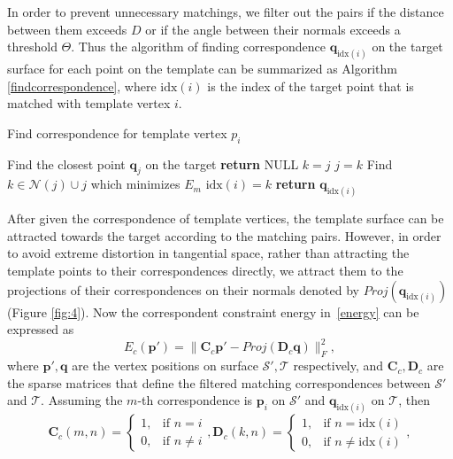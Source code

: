 In order to prevent unnecessary matchings, we filter out the pairs if the distance between them exceeds $D$ or if the angle between their normals exceeds a threshold $\Theta$. Thus the algorithm of finding correspondence $\mathbf q_{\text{idx}(i)}$ on the target surface for each point on the template can be summarized as Algorithm \eqref{findcorrespondence}, where $\text{idx}(i)$ is the index of the target point that is matched with template vertex $i$.
\begin{algorithm}[]
\caption{Find correspondence for template vertex $p_i$}
\label{findcorrespondence}
\begin{algorithmic}[1]
    \State Find the closest point $\mathbf q_j$ on the target
        \State  \textbf{return} NULL
    \EndIf
    \State $k = j$
    \Do
        \State $j = k$
        \State Find $k \in \mathcal{N}(j)\cup j$ which minimizes $E_m$
    \State $\text{idx}(i) = k$
    \State  \textbf{return} $\mathbf q_{\text{idx}(i)}$
\end{algorithmic}
\end{algorithm}
After given the correspondence of template vertices, the template surface can be attracted towards the target according to the matching pairs. However, in order to avoid extreme distortion in tangential space, rather than attracting the template points to their correspondences directly, we attract them to the projections of their correspondences on their normals denoted by $Proj(\mathbf q_{\text{idx}(i)})$ (Figure \ref{fig:4}). Now the correspondent constraint energy in~\eqref{energy} can be expressed as
\begin{equation}
E_c(\mathbf p') = \|\mathbf C_c\mathbf p'-Proj(\mathbf D_c\mathbf q)\|_F^2,
\end{equation}
where $\mathbf p', \mathbf q$ are the vertex positions on surface $\mathcal S',\mathcal T$ respectively, and $\mathbf C_c, \mathbf D_c$ are the sparse matrices that define the filtered matching correspondences between $\mathcal  S'$ and $\mathcal T$. Assuming the $m$-th correspondence is $\mathbf p_i$ on $\mathcal S'$ and $\mathbf q_{\text{idx}(i)}$ on $\mathcal T$, then
\[
    \mathbf C_c(m,n)=
\begin{cases}
    1,\!\!\!\! & \text{if } n \!=\! i\\
    0,\!\!\!\! & \text{if } n \!\neq\! i
\end{cases},
    \mathbf D_c(k,n)=
\begin{cases}
    1,\!\!\!\! & \text{if } n \!=\! \text{idx}(i)\\
    0,\!\!\!\! & \text{if } n \!\neq\! \text{idx}(i)
\end{cases},
\]
